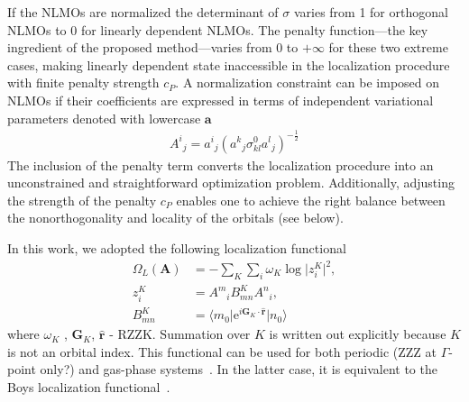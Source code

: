 \documentclass[aps,prl,reprint,amsmath,amssymb]{revtex4-1}
\newcommand*{\imi}{i} %
\newcommand*{\E}{\mathrm{e}}
\newcommand{\ket}[1]{\ensuremath{\vert #1 \rangle}}
\newcommand{\bra}[1]{\ensuremath{\langle #1 \vert}}
\newcommand{\op}[1]{\ensuremath{\hat{#1}}} %
\begin{document}
If the NLMOs are normalized the determinant of $\sigma$ varies from 1 for orthogonal NLMOs to 0 for linearly dependent NLMOs. The penalty function---the key ingredient of the proposed method---varies from 0 to $+\infty$ for these two extreme cases, making linearly dependent state inaccessible in the localization procedure with finite penalty strength $c_P$. 
A normalization constraint can be imposed on NLMOs if their coefficients are expressed in terms of independent variational parameters denoted with lowercase $\mathbf{a}$
%
\begin{equation}
\begin{split}
{A^i}_j = {a^i}_{j} ({a^k}_{j} \sigma^0_{kl}{a^l}_{j})^{-\frac{1}{2}}
\end{split}
\end{equation}
%
The inclusion of the penalty term converts the localization procedure into an unconstrained and straightforward optimization problem. Additionally, adjusting the strength of the penalty $c_P$ enables one to achieve the right balance between the nonorthogonality and locality of the orbitals (see below). 

In this work, we adopted the following localization functional 
%
\begin{equation} \label{eq:fun-loc}
\begin{split}
\Omega_L(\mathbf{A}) &= - \sum_K \sum_i \omega_K \log \vert z_{i}^{K} \vert^2, \\
z_{i}^{K} &= {A^m}_i B^{K}_{mn} {A^n}_i, \\
B^{K}_{mn} &= \bra{m_0} \E^{\imi \mathbf{G}_K \cdot \mathbf{\op{r}}} \ket{n_0}
\end{split}
\end{equation}
%
where $\omega_K$ , $\mathbf{G}_K$, $\mathbf{\op{r}}$ - RZZK. Summation over $K$ is written out explicitly because $K$ is not an orbital index. This functional can be used for both periodic (ZZZ at $\Gamma$-point only?) and gas-phase systems~\cite{berghold2000general}. In the latter case, it is equivalent to the Boys localization functional~\cite{RZK}.
\end{document}
